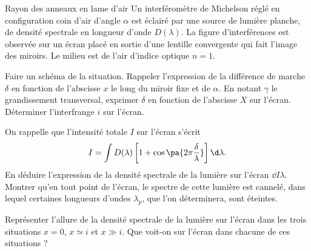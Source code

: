 
\begin{exo}[PC][1][colle]{Rayon des anneaux en lame d'air}
  Un interféromètre de Michelson réglé en configuration coin d'air d'angle $\alpha$ est éclairé par une source de lumière planche, de densité spectrale en longueur d'onde $D(\lambda)$. La figure d'interférences est observée sur un écran placé en sortie d'une lentille convergente qui fait l'image des miroirs. Le milieu est de l'air d'indice optique $n=1$.
  \begin{quest}
    \item Faire un schéma de la situation. Rappeler l'expression de la différence de marche $\delta$ en fonction de l'abscisse $x$ le long du miroir fixe et de $\alpha$. En notant $\gamma$ le grandissement transversal, exprimer $\delta$ en fonction de l'abscisse $X$ sur l'écran. Déterminer l'interfrange $i$ sur l'écran.
  \item On rappelle que l'intensité totale $I$ sur l'écran s'écrit
  \begin{equation}
  I = \int D(\lambda)\left[1 + \cos\pa{2\pi \frac{\delta}{\lambda}}\right] \d \lambda.
  \end{equation}
  En déduire l'expression de la densité spectrale de la lumière sur l'écran $\dd{I}{\lambda}$.
  Montrer qu'en tout point de l'écran, le spectre de cette lumière est cannelé, dans lequel certaines longueurs d'ondes $\lambda_p$, que l'on déterminera, sont éteintes.
  \item Représenter l'allure de la densité spectrale de la lumière sur l'écran dans les trois situations $x=0$, $x \simeq i$ et $x \gg i$. Que voit-on sur l'écran dans chacune de ces situations ?
  \end{quest}
\end{exo}

